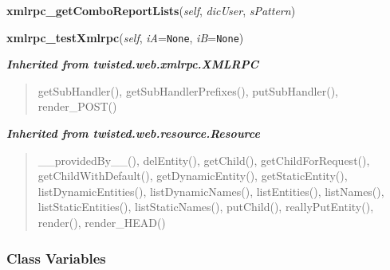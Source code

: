     \vspace{0.5ex}

\hspace{.8\funcindent}\begin{boxedminipage}{\funcwidth}

    \raggedright \textbf{xmlrpc\_getComboReportLists}(\textit{self}, \textit{dicUser}, \textit{sPattern})

\setlength{\parskip}{2ex}
\setlength{\parskip}{1ex}
    \end{boxedminipage}

    \label{cuon:basics:basics:xmlrpc_testXmlrpc}

    \vspace{0.5ex}

\hspace{.8\funcindent}\begin{boxedminipage}{\funcwidth}

    \raggedright \textbf{xmlrpc\_testXmlrpc}(\textit{self}, \textit{iA}={\tt None}, \textit{iB}={\tt None})

\setlength{\parskip}{2ex}
\setlength{\parskip}{1ex}
    \end{boxedminipage}


\large{\textbf{\textit{Inherited from twisted.web.xmlrpc.XMLRPC}}}

\begin{quote}
getSubHandler(), getSubHandlerPrefixes(), putSubHandler(), render\_POST()
\end{quote}

\large{\textbf{\textit{Inherited from twisted.web.resource.Resource}}}

\begin{quote}
\_\_providedBy\_\_(), delEntity(), getChild(), getChildForRequest(), getChildWithDefault(), getDynamicEntity(), getStaticEntity(), listDynamicEntities(), listDynamicNames(), listEntities(), listNames(), listStaticEntities(), listStaticNames(), putChild(), reallyPutEntity(), render(), render\_HEAD()
\end{quote}


  \subsubsection{Class Variables}

